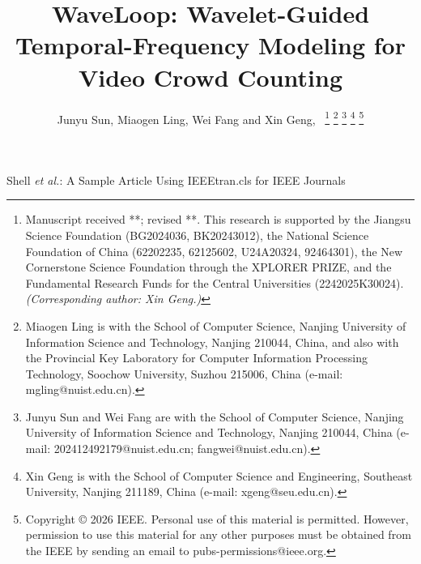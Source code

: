 \documentclass[lettersize,journal]{IEEEtran}
\begin{document}
\title{WaveLoop: Wavelet-Guided Temporal-Frequency Modeling for Video Crowd Counting}

\author{Junyu Sun, Miaogen Ling, Wei Fang and Xin Geng,~
\thanks{Manuscript received **; revised **. This research is supported by the Jiangsu Science Foundation (BG2024036, BK20243012), the National Science Foundation of China (62202235, 62125602, U24A20324, 92464301), the New Cornerstone Science Foundation through the XPLORER PRIZE, and the Fundamental Research Funds for the Central Universities (2242025K30024). \textit{(Corresponding author: Xin Geng.)}}
\thanks{Miaogen Ling is with the School of Computer Science, Nanjing University of Information Science and Technology, Nanjing 210044, China, and also with the Provincial Key Laboratory for Computer Information Processing Technology, Soochow University, Suzhou 215006, China (e-mail: mgling@nuist.edu.cn).}
\thanks{Junyu Sun and Wei Fang are with the School of Computer Science, Nanjing University of Information Science and Technology, Nanjing 210044, China (e-mail: 202412492179@nuist.edu.cn; fangwei@nuist.edu.cn).}
\thanks{Xin Geng is with the School of Computer Science and Engineering, Southeast University, Nanjing 211189, China (e-mail: xgeng@seu.edu.cn).}
\thanks{Copyright © 2026 IEEE. Personal use of this material is permitted. However, permission to use this material for any other purposes must be obtained from the IEEE by sending an email to pubs-permissions@ieee.org.}
}

%
{Shell \MakeLowercase{\textit{et al.}}: A Sample Article Using IEEEtran.cls for IEEE Journals}


\maketitle
\end{document}
